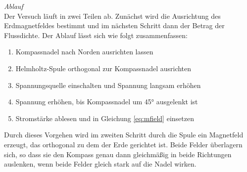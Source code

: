 \textit{Ablauf}\\
Der Versuch läuft in zwei Teilen ab. Zunächst wird die Ausrichtung des Erdmagnetfeldes bestimmt und im nächsten Schritt dann der Betrag der Flussdichte. Der Ablauf lässt sich wie folgt zusammenfassen:
\begin{enumerate}
	\setlength{\itemsep}{-2pt}
	\item Kompassnadel nach Norden ausrichten lassen
	\item Helmholtz-Spule orthogonal zur Kompassnadel ausrichten
	\item Spannungsquelle einschalten und Spannung langsam erhöhen
	\item Spannung erhöhen, bis Kompassnadel um 45° ausgelenkt ist
	\item Stromstärke ablesen und in Gleichung \eqref{eq:mfield} einsetzen
\end{enumerate}

Durch dieses Vorgehen wird im zweiten Schritt durch die Spule ein Magnetfeld erzeugt, das orthogonal zu dem der Erde gerichtet ist. Beide Felder überlagern sich, so dass sie den Kompass genau dann gleichmäßig in beide Richtungen auslenken, wenn beide Felder gleich stark auf die Nadel wirken.

